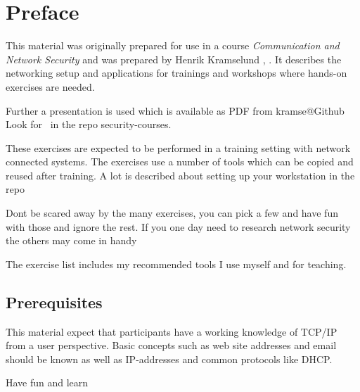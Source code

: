 \documentclass[a4paper,11pt,notitlepage]{report}
\begin{document}
\rm
{}
\newcommand{\subject}[1]{Networking and TCP/IP for Beginners workshop}

\setcounter{tocdepth}{0}

{\color{titlecolor}
\renewcommand{\baselinestretch}{0.3}\setlength{\parskip}{1mm}
\tableofcontents}

\normal
\pagestyle{fancyplain}
\chapter*{\color{titlecolor}Preface}

This material was originally prepared for use in a course \emph{Communication and Network Security } and was prepared by
Henrik Kramselund  ,  .
It describes the networking setup and
applications for trainings and workshops where hands-on exercises are needed.

Further a presentation is used which is available as PDF from kramse@Github\\
Look for \jobname\ in the repo security-courses.

These exercises are expected to be performed in a training setting with network connected systems. The exercises use a number of tools which can be copied and reused after training. A lot is described about setting up your workstation in the repo


Dont be scared away by the many exercises, you can pick a few and have fun with those and ignore the rest. If you one day need to research network security the others may come in handy \smiley

The exercise list includes my recommended tools I use myself and for teaching.

\section*{\color{titlecolor}Prerequisites}

This material expect that participants have a working knowledge of
TCP/IP from a user perspective. Basic concepts such as web site addresses and email should be known as well as IP-addresses and common protocols like DHCP.


\vskip 1cm
Have fun and learn
\end{document}
